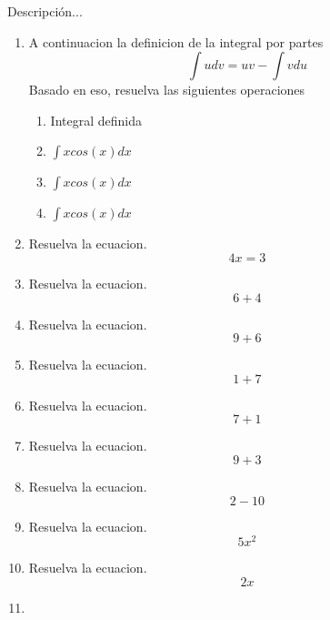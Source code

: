 \documentclass[12pt]{article}%
\begin{document}
%
\normalsize%
\pagestyle{header}%
Descripción...%
\begin{enumerate}[wide, labelwidth=!, labelindent=0pt,label={Pregunta \arabic*. }]%
\item%
%
A continuacion la definicion de la integral por partes%
\[\int udv=uv-\int vdu\]%
Basado en eso, resuelva las siguientes operaciones%
\begin{enumerate}[wide, labelwidth=!, labelindent=0pt,label={\Alph*) }]%
\item%
%
Integral definida\\%
\item%
%
\(\int xcos(x)dx\)%
\item%
%
\(\int xcos(x)dx\)%
\item%
%
\(\int xcos(x)dx\)%
\end{enumerate}%
\item%
%
Resuelva la ecuacion.%
\begin{equation*}4 x = 3\end{equation*}%
\item%
%
Resuelva la ecuacion.%
\begin{equation*}6 + 4\end{equation*}%
\item%
%
Resuelva la ecuacion.%
\begin{equation*}9 + 6\end{equation*}%
\item%
%
Resuelva la ecuacion.%
\begin{equation*}1 + 7\end{equation*}%
\item%
%
Resuelva la ecuacion.%
\begin{equation*}7 + 1\end{equation*}%
\item%
%
Resuelva la ecuacion.%
\begin{equation*}9 + 3\end{equation*}%
\item%
%
Resuelva la ecuacion.%
\begin{equation*}2 - 10\end{equation*}%
\item%
%
Resuelva la ecuacion.%
\begin{equation*}5 x^{2}\end{equation*}%
\item%
%
Resuelva la ecuacion.%
\begin{equation*}2 x\end{equation*}%
\item%

\end{enumerate}
\end{document}

